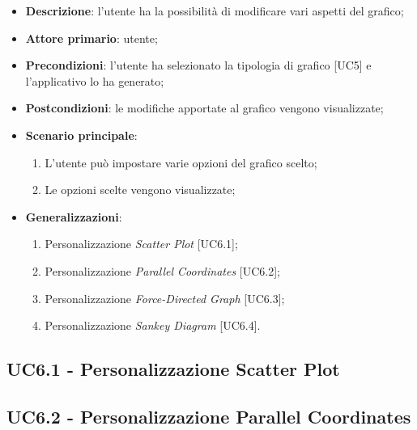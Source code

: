 \begin{itemize}
  \item \textbf{Descrizione}: l'utente ha la possibilità di modificare vari aspetti del grafico;
  \item \textbf{Attore primario}: utente;
  \item \textbf{Precondizioni}: l'utente ha selezionato la tipologia di grafico [UC5] e l'applicativo lo ha generato;
  \item \textbf{Postcondizioni}: le modifiche apportate al grafico vengono visualizzate;
  \item \textbf{Scenario principale}: 
   \begin{enumerate}
    \item L'utente può impostare varie opzioni del grafico scelto;
    \item Le opzioni scelte vengono visualizzate;
  \end{enumerate}
  \item \textbf{Generalizzazioni}:
    \begin{enumerate}
      \item Personalizzazione \textit{Scatter Plot} [UC6.1];
      \item Personalizzazione \textit{Parallel Coordinates} [UC6.2];
      \item Personalizzazione \textit{Force-Directed Graph} [UC6.3];
      \item Personalizzazione \textit{Sankey Diagram} [UC6.4].
    \end{enumerate}
\end{itemize}

\subsection{UC6.1 - Personalizzazione Scatter Plot}
\subsection{UC6.2 - Personalizzazione Parallel Coordinates}


